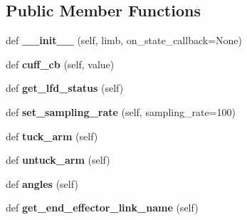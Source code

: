 \subsection*{Public Member Functions}
\begin{DoxyCompactItemize}
\item 
\hypertarget{classaml__robot_1_1baxter__robot_1_1_baxter_arm_a72a5c161c29bd536c6a8727d3138643a}{}\label{classaml__robot_1_1baxter__robot_1_1_baxter_arm_a72a5c161c29bd536c6a8727d3138643a} 
def {\bfseries \+\_\+\+\_\+init\+\_\+\+\_\+} (self, limb, on\+\_\+state\+\_\+callback=None)
\item 
\hypertarget{classaml__robot_1_1baxter__robot_1_1_baxter_arm_ab8c5985c2c013d2da84e7415f2480f35}{}\label{classaml__robot_1_1baxter__robot_1_1_baxter_arm_ab8c5985c2c013d2da84e7415f2480f35} 
def {\bfseries cuff\+\_\+cb} (self, value)
\item 
\hypertarget{classaml__robot_1_1baxter__robot_1_1_baxter_arm_a08034a334645d8504b391a313add1cc7}{}\label{classaml__robot_1_1baxter__robot_1_1_baxter_arm_a08034a334645d8504b391a313add1cc7} 
def {\bfseries get\+\_\+lfd\+\_\+status} (self)
\item 
\hypertarget{classaml__robot_1_1baxter__robot_1_1_baxter_arm_a1f1b2c10d8e309c0cce60a971f5355b4}{}\label{classaml__robot_1_1baxter__robot_1_1_baxter_arm_a1f1b2c10d8e309c0cce60a971f5355b4} 
def {\bfseries set\+\_\+sampling\+\_\+rate} (self, sampling\+\_\+rate=100)
\item 
\hypertarget{classaml__robot_1_1baxter__robot_1_1_baxter_arm_add8768944b81542e122c676f2b38c075}{}\label{classaml__robot_1_1baxter__robot_1_1_baxter_arm_add8768944b81542e122c676f2b38c075} 
def {\bfseries tuck\+\_\+arm} (self)
\item 
\hypertarget{classaml__robot_1_1baxter__robot_1_1_baxter_arm_af3664aaae25213bf3930c821cbf68432}{}\label{classaml__robot_1_1baxter__robot_1_1_baxter_arm_af3664aaae25213bf3930c821cbf68432} 
def {\bfseries untuck\+\_\+arm} (self)
\item 
\hypertarget{classaml__robot_1_1baxter__robot_1_1_baxter_arm_a0434abfd5899e880a6856444ccc9ecae}{}\label{classaml__robot_1_1baxter__robot_1_1_baxter_arm_a0434abfd5899e880a6856444ccc9ecae} 
def {\bfseries angles} (self)
\item 
\hypertarget{classaml__robot_1_1baxter__robot_1_1_baxter_arm_a40dc93e2269ea57aec71457431984bc0}{}\label{classaml__robot_1_1baxter__robot_1_1_baxter_arm_a40dc93e2269ea57aec71457431984bc0} 
def {\bfseries get\+\_\+end\+\_\+effector\+\_\+link\+\_\+name} (self)
\item 

\end{DoxyCompactItemize}
